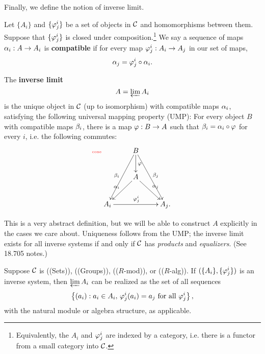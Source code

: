 Finally, we define the notion of inverse limit.
\begin{df}
Let $\{A_i\}$ and $\{\ph^i_j\}$ be a set of objects in $\cal C$ and homomorphisms between them. Suppose that $\{\ph^i_j\}$ is closed under composition.\footnote{Equivalently, the $A_i$ and $\ph^i_j$ are indexed by a category, i.e. there is a functor from a small category into $\cal C$.}
We say a sequence of maps $\al_i:A\to A_i$ is \textbf{compatible} if for every map $\ph^i_j:A_i\to A_j$ in our set of maps,
\[
\al_j=\ph^i_j\circ \al_i.
\]

The \textbf{inverse limit}
\[
A=\varprojlim A_i
\]
is the unique object in $\cal C$ (up to isomorphism) with compatible maps $\al_i$, satisfying the following universal mapping property (UMP):
For every object $B$ with compatible maps $\be_i$, there is a map $\ph:B\to A$ such that $\be_i=\al_i\circ\ph$ for every $i$, i.e. the following commutes:
\begin{equation}\llabel{cone}
\xymatrix{
& B\ar[ldd]_{\be_i}\ar[d]^{\ph} \ar[rdd]^{\be_j} &\\
& A\ar[ld]_{\al_i}\ar[rd]^{\al_j} \\
A_i \ar[rr]^{\ph^i_j} & & A_j.
}
\end{equation}
\end{df}
This is a very abstract definition, but we will be able to construct $A$ explicitly in the cases we care about. Uniqueness follows from the UMP; the inverse limit exists for all inverse systems if and only if $\cal C$ has {\it products} and {\it equalizers}. (See 18.705 notes.)
\begin{thm}
Suppose $\cal C$ is ((Sets)), ((Groups)), (($R$-mod)), or (($R$-alg)).
If $(\{A_i\}, \{\ph^i_j\})$ is an inverse system, then $\varprojlim A_i$ can be realized as the set of all sequences
\[\set{
(a_i)}{ a_i\in A_i,\,\ph^i_j(a_i)=a_j \text{ for all $\ph^i_j$}
},\]
with the natural module or algebra structure, as applicable.
\end{thm}
